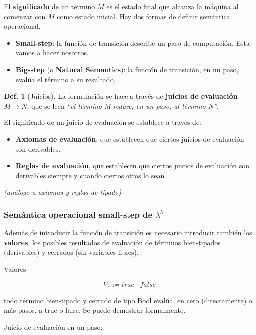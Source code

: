 \documentclass{report}
\theoremstyle{definition} %
\newtheorem{definition}{Def.}[chapter]
\newcommand{\lambdab}{\lambda^b}
\newcommand{\reduces}{\to}
\newcommand{\reduce}[2]{#1 \reduces #2}
\begin{document}
El \textbf{significado} de un término $M$ es el estado final que alcanza la
máquina al comenzar con $M$ como estado inicial. Hay dos formas de definir
semántica operacional,

\begin{itemize}
    \item \textbf{Small-step}: la función de transición describe un paso de
    computación. Esta vamos a hacer nosotros.
    \item \textbf{Big-step} (o \textbf{Natural Semantics}): la función de
    transición, en un paso, evalúa el término a su resultado.
\end{itemize}

\begin{definition}[Juicios]
    La formulación se hace a través de \textbf{juicios de evaluación}
    $\reduce{M}{N}$, que se leen \textit{``el término M reduce, en un paso, al
    término N''}.

    El significado de un juicio de evaluación se establece a través de:

    \begin{itemize}
        \item \textbf{Axiomas de evaluación}, que establecen que ciertos juicios
        de evaluación son derivables.
        \item \textbf{Reglas de evaluación}, que establecen que ciertos juicios
        de evaluación son derivables siempre y cuando ciertos otros lo sean
    \end{itemize}

    \textit{(análogo a axiomas y reglas de tipado)}
\end{definition}


\subsubsection{Semántica operacional small-step de $\lambdab$}
Además de introducir la función de transición es necesario introducir también
los \textbf{valores}, los posibles resultados de evaluación de términos
bien-tipados (derivables) y cerrados (sin variables libres).

Valores

\[
    V ::= true \mid false
\]

todo término bien-tipado y cerrado de tipo Bool evalúa, en cero
(directamente) o más pasos, a true o false. Se puede demostrar formalmente.

Juicio de evaluación en un paso:
\end{document}
